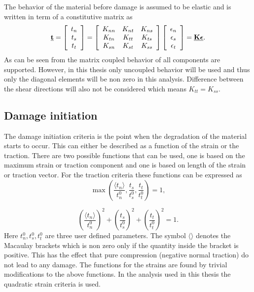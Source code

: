 \documentclass[grain_boundary_law.tex]{subfiles}
\begin{document}
The behavior of the material before damage is assumed to be elastic and is written in term of a constitutive matrix as
 \[ \vec{t} = 
 \left[
\begin{array}{c c c}
t_n\\
t_s\\
t_t \\
\end{array} \right]
=
\left[
\begin{array}{c c c}
K_{nn} & K_{nt} & K_{ns} \\
K_{tn} & K_{tt} & K_{ts} \\
K_{sn} & K_{st} & K_{ss} \\
\end{array} \right]
 \left[
\begin{array}{c c c}
\epsilon_n\\
\epsilon_s\\
\epsilon_t \\
\end{array} \right]
= \vec{K} \vec{\epsilon}.
\]
%
As can be seen from the matrix coupled behavior of all components are supported. However, in this thesis only uncoupled behavior will be used and thus only the diagonal elements will be non zero in this analysis. Difference between the shear directions will also not be considered which means $K_{tt} = K_{ss}$.

\subsection{Damage initiation}

The damage initiation criteria is the point when the degradation of the material starts to occur. This can either be described as a function of the strain or the traction. There are two possible functions that can be used, one is based on the maximum strain or traction component and one is based on length of the strain or traction vector. For the traction criteria these functions can be expressed as
%
\[ \max \left( \frac{\langle t_n \rangle}{t_n^0} ,\frac{ t_s }{t_s^0} ,  \frac{ t_t }{t_t^0}  \right) = 1,  \] 

\[  \left( \frac{\langle t_n \rangle}{t_n^0} \right)^2 +   \left( \frac{ t_s }{t_s^0} \right)^2 +   \left( \frac{ t_t }{t_t^0} \right)^2 = 1.   \]	
%
Here $t_n^0, t_s^0, t_t^0$ are three user defined parameters. The symbol $\langle \rangle$ denotes the Macaulay brackets which is non zero only if the quantity inside the bracket is positive. This has the effect that pure compression (negative normal traction) do not lead to any damage. The functions for the strains are found by trivial modifications to the above functions. In the analysis used in this thesis the quadratic strain criteria is used. 
\end{document}
